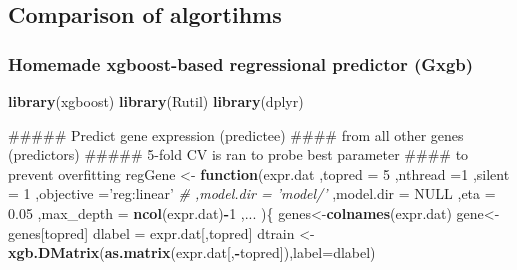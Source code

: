 \documentclass[]{article}
\newenvironment{Shaded}{\begin{snugshade}}{\end{snugshade}}
\newcommand{\KeywordTok}[1]{\textcolor[rgb]{0.13,0.29,0.53}{\textbf{#1}}}
\newcommand{\DataTypeTok}[1]{\textcolor[rgb]{0.13,0.29,0.53}{#1}}
\newcommand{\DecValTok}[1]{\textcolor[rgb]{0.00,0.00,0.81}{#1}}
\newcommand{\FloatTok}[1]{\textcolor[rgb]{0.00,0.00,0.81}{#1}}
\newcommand{\StringTok}[1]{\textcolor[rgb]{0.31,0.60,0.02}{#1}}
\newcommand{\CommentTok}[1]{\textcolor[rgb]{0.56,0.35,0.01}{\textit{#1}}}
\newcommand{\OtherTok}[1]{\textcolor[rgb]{0.56,0.35,0.01}{#1}}
\newcommand{\ControlFlowTok}[1]{\textcolor[rgb]{0.13,0.29,0.53}{\textbf{#1}}}
\newcommand{\OperatorTok}[1]{\textcolor[rgb]{0.81,0.36,0.00}{\textbf{#1}}}
\newcommand{\NormalTok}[1]{#1}
\theoremstyle{definition}
\theoremstyle{definition}
\theoremstyle{definition}
\theoremstyle{remark}
\begin{document}
\subsection{Comparison of algortihms}\label{comparison-of-algortihms}

\subsubsection{Homemade xgboost-based regressional predictor
(Gxgb)}\label{homemade-xgboost-based-regressional-predictor-gxgb}

\begin{Shaded}
\begin{Highlighting}[]
\KeywordTok{library}\NormalTok{(xgboost)}
\KeywordTok{library}\NormalTok{(Rutil)}
\KeywordTok{library}\NormalTok{(dplyr)}

\NormalTok{##### Predict gene expression (predictee) }
\NormalTok{#### from all other genes (predictors)}
\NormalTok{##### 5-fold CV is ran to probe best parameter}
\NormalTok{####  to prevent overfitting}
\NormalTok{regGene <-}\StringTok{ }\ControlFlowTok{function}\NormalTok{(expr.dat}
\NormalTok{  ,}\DataTypeTok{topred =} \DecValTok{5}
\NormalTok{  ,}\DataTypeTok{nthread =}\DecValTok{1}
\NormalTok{  ,}\DataTypeTok{silent =} \DecValTok{1}
\NormalTok{  ,}\DataTypeTok{objective =}\StringTok{'reg:linear'}
  \CommentTok{# ,model.dir = 'model/'}
\NormalTok{  ,}\DataTypeTok{model.dir =} \OtherTok{NULL}
\NormalTok{  ,}\DataTypeTok{eta =} \FloatTok{0.05}
\NormalTok{  ,}\DataTypeTok{max_depth =} \KeywordTok{ncol}\NormalTok{(expr.dat)}\OperatorTok{-}\DecValTok{1}
\NormalTok{  ,...}
\NormalTok{  )\{}
\NormalTok{  genes<-}\KeywordTok{colnames}\NormalTok{(expr.dat)}
\NormalTok{  gene<-genes[topred]}
\NormalTok{  dlabel =}\StringTok{ }\NormalTok{expr.dat[,topred]}
\NormalTok{  dtrain <-}\StringTok{ }\KeywordTok{xgb.DMatrix}\NormalTok{(}\KeywordTok{as.matrix}\NormalTok{(expr.dat[,}\OperatorTok{-}\NormalTok{topred]),}\DataTypeTok{label=}\NormalTok{dlabel)}


\end{Highlighting}
\end{Shaded}
\end{document}
